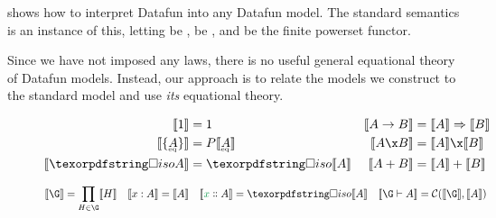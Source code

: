\documentclass{rntz}\usepackage{fantasy}%
\begin{document}
\noindent
{} shows how to interpret Datafun into any Datafun
model. The standard semantics is an instance of this, letting \catC{} be
\Poset{}, \iso{} be \iso{}, and \pfin{} be the finite powerset functor.

Since we have not imposed any laws, there is no useful general equational theory
of Datafun models. Instead, our approach is to relate the models we construct to
the standard model and use \emph{its} equational theory.


\begin{figure*}

  \begin{align*}
    \den{\tunit} &= \termO & \den{A \to B} &= \expO{\den{A}}{\den{B}}
    \\
    \den{\tseteq A} &= \pfinof{\den{\eqt A}}
    & \den{A \x B} &= \den{A} \x \den{B}
    \\
    \den{\isof A} &= \discof{\den{A}} & \den{A + B} &= \den{A} + \den{B}
  \end{align*}

  \begin{align*}
    \den{\G} &= \prod_{H \in \G} \den{H} &
    \den{\h x A} &= \den{A} & \den{\hd x A} &= \discof{\den{A}} &
    \den{\G \vdash A} &= \catC(\den\G, \den A)
  \end{align*}

  \vspace{.5\baselineskip}


\end{figure*}
\end{document}

